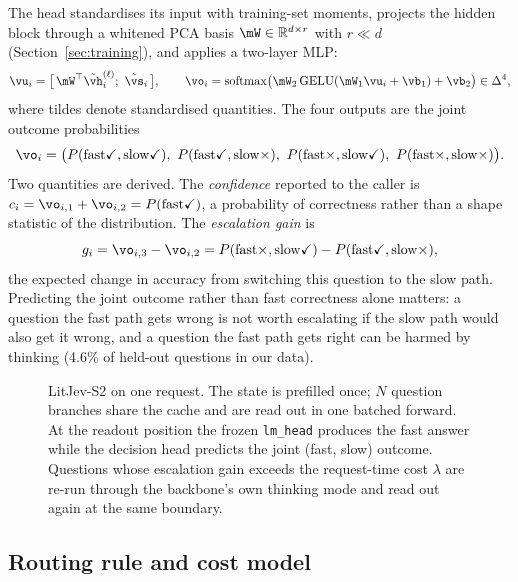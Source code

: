 \documentclass{article}
\newcommand{\fast}{\mathrm{fast}}
\newcommand{\slow}{\mathrm{slow}}
\newcommand{\gain}{g}
\newcommand{\method}{LitJev-S2}
\begin{document}
The head standardises its input with training-set moments, projects the hidden block through a whitened PCA basis $\mW\in\mathbb{R}^{d\times r}$ with $r\ll d$ (Section~\ref{sec:training}), and applies a two-layer MLP:
\begin{equation}
  \vu_i = \big[\,\mW^\top \tilde{\vh}_i^{(\ell)};\ \tilde{\vs}_i\,\big],\qquad
  \vo_i = \mathrm{softmax}\big(\mW_2\,\mathrm{GELU}(\mW_1\vu_i+\vb_1)+\vb_2\big)\in\Delta^{4},
\end{equation}
where tildes denote standardised quantities. The four outputs are the joint outcome probabilities
\begin{equation}
  \vo_i=\big(P(\fast\checkmark,\slow\checkmark),\ P(\fast\checkmark,\slow\times),\ P(\fast\times,\slow\checkmark),\ P(\fast\times,\slow\times)\big).
\end{equation}
Two quantities are derived. The \emph{confidence} reported to the caller is $c_i=\vo_{i,1}+\vo_{i,2}=P(\fast\checkmark)$, a probability of correctness rather than a shape statistic of the distribution. The \emph{escalation gain} is
\begin{equation}
  \gain_i=\vo_{i,3}-\vo_{i,2}=P(\fast\times,\slow\checkmark)-P(\fast\checkmark,\slow\times),
  \label{eq:gain}
\end{equation}
the expected change in accuracy from switching this question to the slow path. Predicting the joint outcome rather than fast correctness alone matters: a question the fast path gets wrong is not worth escalating if the slow path would also get it wrong, and a question the fast path gets right can be harmed by thinking (4.6\% of held-out questions in our data).

\begin{figure}[t]
\centering

\caption{\method{} on one request. The state is prefilled once; $N$ question branches share the cache and are read out in one batched forward. At the readout position the frozen \texttt{lm\_head} produces the fast answer while the decision head predicts the joint (fast, slow) outcome. Questions whose escalation gain exceeds the request-time cost $\lambda$ are re-run through the backbone's own thinking mode and read out again at the same boundary.}
\label{fig:arch}
\end{figure}

\subsection{Routing rule and cost model}
\label{sec:routing}
\end{document}

